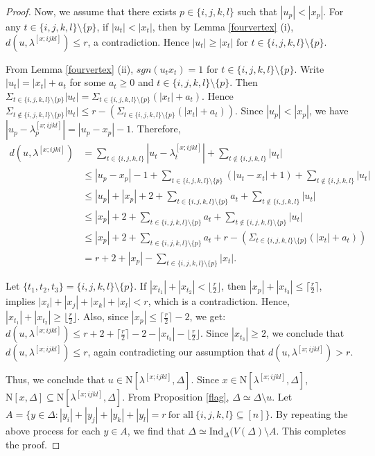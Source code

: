\documentclass{amsart}
\theoremstyle{definition}
\theoremstyle{remark}
\numberwithin{equation}{section}
\newcommand{\D}{\Delta}
\newcommand{\f}{\lfloor\frac{r}{2}\rfloor}
\newcommand{\cil}{\lceil\frac{r}{2}\rceil}
\def\n{{\mathrm{N}}}
\begin{document}
\begin{proof}
	
	Now, we assume that there exists  $p \in \{i, j, k, l\}$ such that $|u_p| < |x_p|$. For any $t \in \{i, j , k ,l\}\setminus\{p\}$, if $|u_t| < |x_t|$, then by Lemma \ref{fourvertex} (i), $d(u,\lambda^{[x;ijkl]})\leq r$, a contradiction. Hence  $|u_t| \geq |x_t|$ for $t \in \{i, j, k, l\}\setminus\{p\} $. 
	
	From Lemma \ref{fourvertex} (ii), $sgn(u_tx_t)=1$ for $t \in \{i,j, k, l\} \setminus \{p\}$.  Write $|u_t| = |x_t| + a_t$ for some $a_t \geq 0$ and $t \in \{i,j, k, l\} \setminus\{p\}$. Then $\Sigma_{t \in \{i,j, k, l\} \setminus\{p\}} |u_t| = \Sigma_{t \in \{i,j, k, l\} \setminus\{p\}} (|x_t| +a_t)$. Hence $\Sigma_{t \not\in \{i,j, k, l\} \setminus\{p\}} |u_t| \leq r- ( \Sigma_{t \in \{i,j, k, l\} \setminus\{p\}} (|x_t| +a_t))$. Since $|u_p| < |x_p|$, we have $|u_p - \lambda^{[x;ijkl]}_p| = |u_p - x_p| - 1$.  
	Therefore,
	\begin{align*}
		d(u, \lambda^{[x;ijkl]}) &= \sum_{t \in \{i, j, k, l\}}|u_t - \lambda^{[x;ijkl]}_t| 
         + \sum_{t \notin \{i, j, k, l\}} |u_t| \\
		&\leq |u_p - x_p| - 1 + \sum_{t \in \{i,j, k, l\} \setminus\{p\}} (|u_t - x_t| + 1)  + \sum_{t \notin \{i, j, k, l\}} |u_t| \\
		&\leq |u_p| + |x_p| +2+ \sum_{t \in \{i,j, k, l\} \setminus\{p\}} a_t + \sum_{t \notin \{i, j, k, l\}} |u_t| \\
		&\leq  |x_p| + 2+\sum_{t \in \{i,j, k, l\} \setminus\{p\}} a_t + \sum_{t \notin \{i, j, k, l\}\setminus\{p\}} |u_t| \\
		&\leq |x_p|+2+\sum_{t \in \{i,j, k, l\} \setminus\{p\}} a_t + r - ( \Sigma_{t \in \{i,j, k, l\} \setminus\{p\}} (|x_t| +a_t))  \\
		&= r + 2 + |x_p| -  \sum_{t \in \{i,j, k, l\} \setminus\{p\}} |x_t|.
	\end{align*}
	
	Let $\{t_1,t_2,t_3\}=\{i,j,k,l\}\setminus \{p\}$. If $|x_{t_1}| + |x_{t_2}| < \f$, then $|x_p| + |x_{t_3}| \leq \cil$, implies $|x_i| + |x_j| + |x_k| + |x_l| < r$, which is a contradiction. Hence, $|x_{t_1}| + |x_{t_2}| \geq \f$. Also, since $|x_p| \leq \cil - 2$, we get: $
	d(u, \lambda^{[x;ijkl]}) \leq r + 2 + \cil - 2 - |x_{t_3}| - \f$.  Since $|x_{t_3}| \geq 2$, we conclude that $d(u, \lambda^{[x;ijkl]}) \leq r $, again contradicting our assumption that $d(u, \lambda^{[x;ijkl]}) > r$. 
	
	Thus, we conclude that $u\in \n[\lambda^{[x;ijkl]},\D]$. Since $x\in \n[\lambda^{[x;ijkl]}, \D]$, $\n[x,\D]\subseteq \n[\lambda^{[x;ijkl]}, \D]$. From Proposition \ref{flag}, $\D\simeq \D\setminus u$. Let $A=\{y\in \D: |y_i|+|y_j|+|y_k|+|y_l|=r \ \text{for all}\ \{i,j,k,l\}\subseteq [n] \}$. By repeating the above process for each $y\in A$, we find that $\D\simeq \mathrm{Ind}_{\D}(V(\D)\setminus A$. 
	This completes the proof.
\end{proof}
\end{document}
